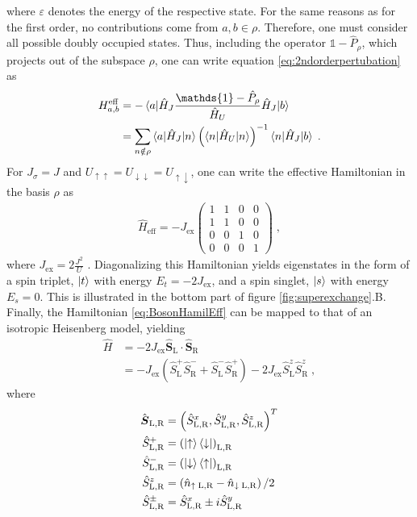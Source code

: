 where $\varepsilon$ denotes the energy of the respective state. For the same reasons as for the first order, no contributions come from $a,b \in \rho$. Therefore, one must consider all possible doubly occupied states. Thus, including the operator $\mathds{1} - \hat{P}_{\rho}$, which projects out of the subspace $\rho$, one can write equation \eqref{eq:2ndorderpertubation} as
\begin{align}
	H_{a,b}^{\mathrm{eff}} &=  - \braket{a|\hat{H}_J \frac{\mathds{1} - \hat{P}_{\rho}}{\hat{H}_U} \hat{H}_J|b} \nonumber \\
	&= \sum_{n \notin \rho} \braket{a|\hat{H}_J|n} \left( \braket{n |\hat{H}_U | n} \right)^{-1} \braket{n|\hat{H}_J|b} \; .
\end{align}
For $J_{\sigma} = J $ and $U_{\uparrow\uparrow} = U_{\downarrow\downarrow} = U_{\uparrow\downarrow}$, one can write the effective Hamiltonian in the basis $\rho$ as
\begin{align}
\hat{H}_{\mathrm{eff}} = -J_{\mathrm{ex}} \begin{pmatrix}
           1 & 1 & 0 & 0 \\
           1 & 1 & 0 & 0 \\
           0 & 0 & 1 & 0 \\
           0 & 0 & 0 & 1 
         \end{pmatrix} \; , \label{eq:BosonHamilEff}
\end{align}
where $J_{\mathrm{ex}} = 2 \frac{J^2}{U}$ \cite{Duan2003}. Diagonalizing this Hamiltonian yields eigenstates in the form of a spin triplet, $\ket{t}$ with energy $E_t = -2 J_{\mathrm{ex}}$, and a spin singlet, $\ket{s}$ with energy $E_s = 0$. This is illustrated in the bottom part of figure \ref{fig:superexchange}.B.
Finally, the Hamiltonian \eqref{eq:BosonHamilEff} can be mapped to that of an isotropic Heisenberg model, yielding \cite{Trotzky2008}
\begin{align}
	\hat{H} &= -2 J_{\mathrm{ex}} \hat{\boldsymbol{S}}_{\mathrm{L}} \cdot \hat{\boldsymbol{S}}_{\mathrm{R}} \nonumber \\
	&= - J_{\mathrm{ex}} \left( \hat{S}_{\mathrm{L}}^{+} \hat{S}_{\mathrm{R}}^{-} + \hat{S}_{\mathrm{L}}^{-} \hat{S}_{\mathrm{R}}^{+} \right) - 2 J_{\mathrm{ex}} \hat{S}_{\mathrm{L}}^{z} \hat{S}_{\mathrm{R}}^{z} \; , \label{eq:twositeFerro}
\end{align}
where 
\begin{align*}
\hat{\boldsymbol{S}}_{\mathrm{L,R}} &= \left(  \hat{S}_{\mathrm{L,R}}^{x} , \hat{S}_{\mathrm{L,R}}^{y} , \hat{S}_{\mathrm{L,R}}^{z} \right)^{T} \\
\hat{S}_{\mathrm{L},\mathrm{R}}^{+} &= \left( \ket{\uparrow}\bra{\downarrow} \right)_{\mathrm{L},\mathrm{R}} \\
\hat{S}_{\mathrm{L},\mathrm{R}}^{-} &= \left( \ket{\downarrow}\bra{\uparrow} \right)_{\mathrm{L},\mathrm{R}} \\
\hat{S}_{\mathrm{L},\mathrm{R}}^{z} &= \left( \hat{n}_{\uparrow \; \mathrm{L},\mathrm{R}} - \hat{n}_{\downarrow \; \mathrm{L},\mathrm{R}} \right)/2 \\
\hat{S}_{\mathrm{L},\mathrm{R}}^{\pm} &= \hat{S}_{\mathrm{L},\mathrm{R}}^{x} \pm i \hat{S}_{\mathrm{L},\mathrm{R}}^{y}
\end{align*}
